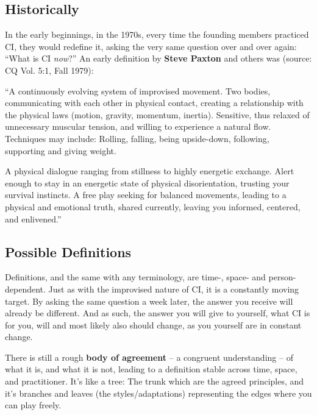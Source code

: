 \subsection{Historically}\label{sec:historically}

In the early beginnings, in the 1970s, every time the founding members practiced CI, they would redefine it, asking the very same question over and over again: ``What is CI \textit{now}?'' An early definition by \textbf{Steve Paxton} and others was (source: CQ Vol. 5:1, Fall 1979):

\begin{displayquote}
    ``A continuously evolving system of improvised movement.
    Two bodies, communicating with each other in physical contact, creating a relationship with the physical laws (motion, gravity, momentum, inertia).
    Sensitive, thus relaxed of unnecessary muscular tension, and willing to experience a natural flow.
    Techniques may include: Rolling, falling, being upside-down, following, supporting and giving weight.

    A physical dialogue ranging from stillness to highly energetic exchange.
    Alert enough to stay in an energetic state of physical disorientation, trusting your survival instincts.
    A free play seeking for balanced movements, leading to a physical and emotional truth, shared currently, leaving you informed, centered, and enlivened.''
\end{displayquote}

\subsection{Possible Definitions}\label{sec:possible-definitions}

Definitions, and the same with any terminology, are time-, space- and person-dependent.
Just as with the improvised nature of CI, it is a constantly moving target.
By asking the same question a week later, the answer you receive will already be different.
And as such, the answer you will give to yourself, what CI is for you, will and most likely also should change, as you yourself are in constant change.

There is still a rough \textbf{body of agreement} -- a congruent understanding -- of what it is, and what it is not, leading to a definition stable across time, space, and practitioner.
It's like a tree: The trunk which are the agreed principles, and it's branches and leaves (the styles/adaptations) representing the edges where you can play freely.

